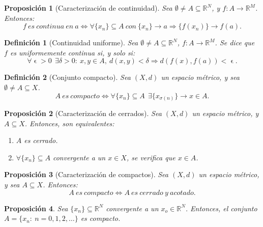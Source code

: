 \documentclass[11pt, a4paper, titlepage]{article}
\let\epsilon\upvarepsilon
\theoremstyle{theorem-style}
\newtheorem*{nprop}{Proposición}
\theoremstyle{definition-style}
\newtheorem*{ndef}{Definición}
\theoremstyle{remark-style}
\theoremstyle{example-style}
\newenvironment{nlist}
{\begin{enumerate}
\renewcommand\labelenumi{(\emph{\roman{enumi})}}}
{\end{enumerate}}
\begin{document}
\begin{nprop}[Caracterización de continuidad]
Sea $\emptyset \ne A \subseteq \mathbb{R}^N$, y $f:A\longrightarrow \mathbb{R}^M$. Entonces: $$f\ es\ continua\ en\ a \iff \forall \{x_n\}\subseteq A\ con\ \{x_n\} \rightarrow a \Rightarrow \{f(x_n)\} \rightarrow f(a).$$
\end{nprop}



\begin{ndef}[Continuidad uniforme]
Sea $\emptyset \ne A \subseteq \mathbb{R}^N$, $f:A \longrightarrow \mathbb{R}^M$. Se dice que $f$ es uniformemente continua si, y solo si: $$\forall \epsilon > 0 \ \ \exists \delta > 0 : \ x,y \in A,\ d(x,y) < \delta \Rightarrow d(f(x),f(a)) < \epsilon.$$
\end{ndef}


\begin{ndef}[Conjunto compacto]
Sea $(X,d)$ un espacio métrico, y sea $\emptyset \ne A \subseteq X$. $$A\ es\ compacto \iff \forall \{x_n\} \subseteq A\ \ \exists \{x_{\sigma(n)}\} \rightarrow x\in A.$$
\end{ndef}



\begin{nprop}[Caracterización de cerrados]
Sea $(X,d)$ un espacio métrico, y $A\subseteq X$. Entonces, son equivalentes:

\begin{nlist}
\item $A$ es cerrado.
\item $\forall \{x_n\} \subseteq A$ convergente a un $x \in X$, se verifica que $x\in A$.
\end{nlist}

\end{nprop}



\begin{nprop}[Caracterización de compactos]
Sea $(X,d)$ un espacio métrico, y sea $A \subseteq X$. Entonces: $$A\ es\ compacto \iff A\ es\ cerrado\ y\ acotado.$$
\end{nprop}



\begin{nprop}
Sea $\{x_n\} \subseteq \mathbb{R}^N$ convergente a un $x_o \in \mathbb{R}^N$. Entonces, el conjunto \hfill \\$A = \{x_n:\ n=0,1,2,\dots \}$ es compacto.
\end{nprop}
\end{document}
